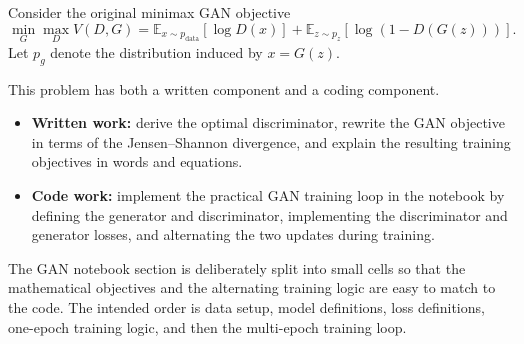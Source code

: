 \documentclass[submit]{harvardml}
\begin{document}
\begin{problem}[GANs]
Consider the original minimax GAN objective
\[
\min_G \max_D V(D,G) = \mathbb E_{x\sim p_{\mathrm{data}}}[\log D(x)] + \mathbb E_{z\sim p_z}[\log(1-D(G(z)))] .
\]
Let \(p_g\) denote the distribution induced by \(x = G(z)\).

This problem has both a written component and a coding component.

\begin{itemize}[leftmargin=*]
    \item \textbf{Written work:} derive the optimal discriminator, rewrite the GAN objective in terms of the Jensen--Shannon divergence, and explain the resulting training objectives in words and equations.
    \item \textbf{Code work:} implement the practical GAN training loop in the notebook by defining the generator and discriminator, implementing the discriminator and generator losses, and alternating the two updates during training.
\end{itemize}

The GAN notebook section is deliberately split into small cells so that the mathematical objectives and the alternating training logic are easy to match to the code. The intended order is data setup, model definitions, loss definitions, one-epoch training logic, and then the multi-epoch training loop.


\end{problem}
\end{document}

